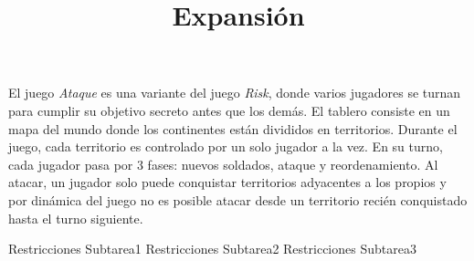 \documentclass{oci}
\title{Expansión}
\begin{document}
\begin{problemDescription}
El juego \emph{Ataque} es una variante del juego \emph{Risk}, donde varios
jugadores se turnan para cumplir su objetivo secreto antes que los demás.
El tablero consiste en un mapa del mundo donde los continentes están divididos
en territorios. Durante el juego, cada territorio es controlado por un solo
jugador a la vez.
En su turno, cada jugador pasa por 3 fases: nuevos soldados, ataque y
reordenamiento.
Al atacar, un jugador solo puede conquistar territorios adyacentes a los
propios y por dinámica del juego no es posible atacar desde un territorio
recién conquistado hasta el turno siguiente.


\end{problemDescription}

\begin{inputDescription}
\lipsum[1]
\end{inputDescription}

\begin{outputDescription}
\lipsum[1]
\end{outputDescription}

\begin{scoreDescription}
   Restricciones Subtarea1
   Restricciones Subtarea2
   Restricciones Subtarea3
\end{scoreDescription}

\begin{sampleDescription}
\end{sampleDescription}
\end{document}
